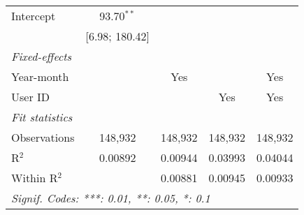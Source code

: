 \begin{table}[htbp]
\begin{threeparttable}[b]
\begin{tabular}{lcccc}
         Intercept                       & 93.70$^{**}$      &                   &                   &   \\   
                                         & [6.98; 180.42]    &                   &                   &   \\   
         \midrule
         \emph{Fixed-effects}\\
         Year-month                      &                   & Yes               &                   & Yes\\  
         User ID                         &                   &                   & Yes               & Yes\\  
         \midrule
         \emph{Fit statistics}\\
         Observations                    & 148,932           & 148,932           & 148,932           & 148,932\\  
         R$^2$                           & 0.00892           & 0.00944           & 0.03993           & 0.04044\\  
         Within R$^2$                    &                   & 0.00881           & 0.00945           & 0.00933\\  
         \midrule \midrule
         \multicolumn{5}{l}{\emph{Signif. Codes: ***: 0.01, **: 0.05, *: 0.1}}\\
      \end{tabular}
   \end{threeparttable}
\end{table}


